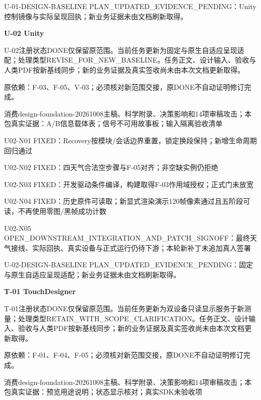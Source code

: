 \documentclass[11pt,a4paper]{article}
\newcommand{\reviewsection}[1]{\par\Needspace{5\baselineskip}\vspace{10pt}\begin{center}{\titlelatin\titlecjk\bfseries\fontsize{14}{20}\selectfont #1}\end{center}}
\begin{document}
U-\allowbreak{}01-\allowbreak{}DESIGN-\allowbreak{}BASELINE PLAN\_\allowbreak{}UPDATED\_\allowbreak{}EVIDENCE\_\allowbreak{}PENDING：Unity控制镜像与实际呈现回执；新业务证据未由文档刷新取得。


\reviewsection{U-\allowbreak{}02 Unity}
U-\allowbreak{}02注册状态DONE仅保留原范围。当前任务更新为固定与原生自适应呈现适配；处理类型REVISE\_\allowbreak{}FOR\_\allowbreak{}NEW\_\allowbreak{}BASELINE。任务正文、设计输入、验收与人类PDF按新基线同步；新的业务证据及真实签收尚未由本次文档更新取得。


原依赖：F-\allowbreak{}03、F-\allowbreak{}05、V-\allowbreak{}03；必须核对新范围交接，原DONE不自动证明修订完成。


消费design-\allowbreak{}foundation-\allowbreak{}20261008主稿、科学附录、决策影响和14项审稿攻击；本包真实证据：A/\allowbreak{}B信息载体表；信号不可用故事板；输入隔离验收清单


U02-\allowbreak{}N01 FIXED：Recovery按模块/\allowbreak{}会话边界重置，锁定换段保持；新增生命周期回归通过


U02-\allowbreak{}N02 FIXED：四天气合法空步骤与F-\allowbreak{}05对齐；非空缺实例仍拒绝


U02-\allowbreak{}N03 FIXED：开发驱动条件编译，构建取得F-\allowbreak{}03作用域授权；正式门未放宽


U02-\allowbreak{}N04 FIXED：历史原件可读取；新显式渲染演示120帧像素通过且五阶段可读，不再使用零图/\allowbreak{}黑帧成功计数


U02-\allowbreak{}N05 OPEN\_\allowbreak{}DOWNSTREAM\_\allowbreak{}INTEGRATION\_\allowbreak{}AND\_\allowbreak{}PATCH\_\allowbreak{}SIGNOFF：最终天气接线、实际回执、真实设备与正式运行仍待下游；本轮新补丁未追加真人签署


U-\allowbreak{}02-\allowbreak{}DESIGN-\allowbreak{}BASELINE PLAN\_\allowbreak{}UPDATED\_\allowbreak{}EVIDENCE\_\allowbreak{}PENDING：固定与原生自适应呈现适配；新业务证据未由文档刷新取得。


\reviewsection{T-\allowbreak{}01 TouchDesigner}
T-\allowbreak{}01注册状态DONE仅保留原范围。当前任务更新为双设备只读显示服务于新测量；处理类型RETAIN\_\allowbreak{}WITH\_\allowbreak{}SCOPE\_\allowbreak{}CLARIFICATION。任务正文、设计输入、验收与人类PDF按新基线同步；新的业务证据及真实签收尚未由本次文档更新取得。


原依赖：F-\allowbreak{}01、F-\allowbreak{}04、F-\allowbreak{}05；必须核对新范围交接，原DONE不自动证明修订完成。


消费design-\allowbreak{}foundation-\allowbreak{}20261008主稿、科学附录、决策影响和14项审稿攻击；本包真实证据：预览用途说明；状态显示核对；真实SDK未验收项
\end{document}
